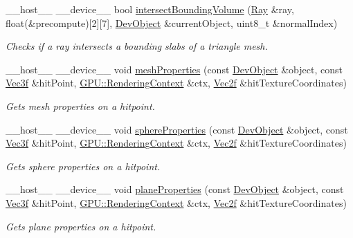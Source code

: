 \begin{DoxyCompactItemize}
\+\_\+\+\_\+host\+\_\+\+\_\+ \+\_\+\+\_\+device\+\_\+\+\_\+ bool \hyperlink{group__intersection__test__prperties_gaf6bbee9e8a6ee564017fa94cd9e6ec63}{intersect\+Bounding\+Volume} (\hyperlink{class_ray}{Ray} \&ray, float(\&precompute)\mbox{[}2\mbox{]}\mbox{[}7\mbox{]}, \hyperlink{class_dev_object}{Dev\+Object} \&current\+Object, uint8\+\_\+t \&normal\+Index)
\begin{DoxyCompactList}\small\item\em Checks if a ray intersects a bounding slabs of a triangle mesh. \end{DoxyCompactList}\item 
\+\_\+\+\_\+host\+\_\+\+\_\+ \+\_\+\+\_\+device\+\_\+\+\_\+ void \hyperlink{group__intersection__test__prperties_gaa26e85d7aac46c25d6a1b975423f968d}{mesh\+Properties} (const \hyperlink{class_dev_object}{Dev\+Object} \&object, const \hyperlink{class_vec3}{Vec3f} \&hit\+Point, \hyperlink{struct_g_p_u_1_1_rendering_context}{G\+P\+U\+::\+Rendering\+Context} \&ctx, \hyperlink{class_vec2}{Vec2f} \&hit\+Texture\+Coordinates)
\begin{DoxyCompactList}\small\item\em Gets mesh properties on a hitpoint. \end{DoxyCompactList}\item 
\+\_\+\+\_\+host\+\_\+\+\_\+ \+\_\+\+\_\+device\+\_\+\+\_\+ void \hyperlink{group__intersection__test__prperties_gae821d5671069271f7c39d22ca8950f3d}{sphere\+Properties} (const \hyperlink{class_dev_object}{Dev\+Object} \&object, const \hyperlink{class_vec3}{Vec3f} \&hit\+Point, \hyperlink{struct_g_p_u_1_1_rendering_context}{G\+P\+U\+::\+Rendering\+Context} \&ctx, \hyperlink{class_vec2}{Vec2f} \&hit\+Texture\+Coordinates)
\begin{DoxyCompactList}\small\item\em Gets sphere properties on a hitpoint. \end{DoxyCompactList}\item 
\+\_\+\+\_\+host\+\_\+\+\_\+ \+\_\+\+\_\+device\+\_\+\+\_\+ void \hyperlink{group__intersection__test__prperties_gae25700b3104d615db9d575d086c3d994}{plane\+Properties} (const \hyperlink{class_dev_object}{Dev\+Object} \&object, const \hyperlink{class_vec3}{Vec3f} \&hit\+Point, \hyperlink{struct_g_p_u_1_1_rendering_context}{G\+P\+U\+::\+Rendering\+Context} \&ctx, \hyperlink{class_vec2}{Vec2f} \&hit\+Texture\+Coordinates)
\begin{DoxyCompactList}\small\item\em Gets plane properties on a hitpoint. \end{DoxyCompactList}\item 

\end{DoxyCompactItemize}
